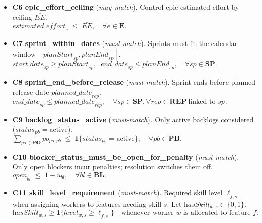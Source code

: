 \documentclass[11pt,a4paper]{article}
\begin{document}
\begin{itemize}[leftmargin=2em,itemsep=0.6em]
  \item \textbf{C6 epic\_effort\_ceiling} (\emph{may-match}). Control epic estimated effort by ceiling $\overline{EE}$.\\
  $\displaystyle \textit{estimated\_effort}_{e} \;\le\; \overline{EE}, \quad \forall e \in \mathbf{E}.$

  \item \textbf{C7 sprint\_within\_dates} (\emph{must-match}). Sprints must fit the calendar window $[\textit{planStart}_{sp},\textit{planEnd}_{sp}]$.\\
  $\displaystyle \textit{start\_date}_{sp} \ge \textit{planStart}_{sp}, \;\; \textit{end\_date}_{sp} \le \textit{planEnd}_{sp}, \quad \forall sp \in \mathbf{SP}.$

  \item \textbf{C8 sprint\_end\_before\_release} (\emph{must-match}). Sprint ends before planned release date $\textit{planned\_date}_{rep}$.\\
  $\displaystyle \textit{end\_date}_{sp} \le \textit{planned\_date}_{rep}, \quad \forall sp \in \mathbf{SP}, \forall rep \in \mathbf{REP}\ \text{linked to } sp.$

  \item \textbf{C9 backlog\_status\_active} (\emph{must-match}). Only active backlogs considered ($\textit{status}_{pb}=\text{active}$).\\
  $\displaystyle \sum_{po \in \mathbf{PO}} po_{po,pb} \;\le\; \mathbf{1}\{\textit{status}_{pb}=\text{active}\}, \quad \forall pb \in \mathbf{PB}.$

  \item \textbf{C10 blocker\_status\_must\_be\_open\_for\_penalty} (\emph{must-match}). Only open blockers incur penalties; resolution switches them off.\\
  $\displaystyle \textit{open}_{bl} \;\le\; 1 - u_{bl}, \quad \forall bl \in \mathbf{BL}.$

  \item \textbf{C11 skill\_level\_requirement} (\emph{must-match}). Required skill level $\underline{\ell}_{f,s}$ when assigning workers to features needing skill $s$. Let $\textit{hasSkill}_{w,s}\in\{0,1\}$.\\
  $\displaystyle \textit{hasSkill}_{w,s} \ge \mathbf{1}\{\textit{level}_{w,s}\ge \underline{\ell}_{f,s}\} \quad \text{whenever worker $w$ is allocated to feature $f$.}$
\end{itemize}
\end{document}
